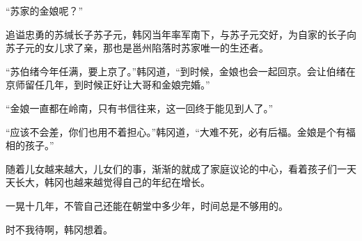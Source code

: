 “苏家的金娘呢？”

追谥忠勇的苏缄长子苏子元，韩冈当年率军南下，与苏子元交好，为自家的长子向苏子元的女儿求了亲，那也是邕州陷落时苏家唯一的生还者。

“苏伯绪今年任满，要上京了。”韩冈道，“到时候，金娘也会一起回京。会让伯绪在京师留任几年，到时候正好让大哥和金娘完婚。”

“金娘一直都在岭南，只有书信往来，这一回终于能见到人了。”

“应该不会差，你们也用不着担心。”韩冈道，“大难不死，必有后福。金娘是个有福相的孩子。”

随着儿女越来越大，儿女们的事，渐渐的就成了家庭议论的中心，看着孩子们一天天长大，韩冈也越来越觉得自己的年纪在增长。

一晃十几年，不管自己还能在朝堂中多少年，时间总是不够用的。

时不我待啊，韩冈想着。


